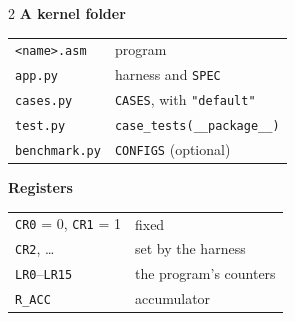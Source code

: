 \documentclass[11pt,a4paper]{article}
\begin{document}
\begin{tcolorbox}[enhanced, colback=white, colframe=muted, boxrule=0.8pt, arc=4pt,
  left=10pt, right=10pt, top=8pt, bottom=10pt]
{\begin{multicols}{2}
\medskip\textbf{\sffamily A kernel folder}\par
\begin{tabular}{@{}ll@{}}
\texttt{<name>.asm} & program \\
\texttt{app.py} & harness and \texttt{SPEC} \\
\texttt{cases.py} & \texttt{CASES}, with \texttt{"default"} \\
\texttt{test.py} & \texttt{case\_tests(\_\_package\_\_)} \\
\texttt{benchmark.py} & \texttt{CONFIGS} (optional) \\
\end{tabular}

\medskip\textbf{\sffamily Registers}\par
\begin{tabular}{@{}ll@{}}
\texttt{CR0} = 0, \texttt{CR1} = 1 & fixed \\
\texttt{CR2}, \ldots & set by the harness \\
\texttt{LR0}--\texttt{LR15} & the program's counters \\
\texttt{R\_ACC} & accumulator \\
\end{tabular}

\end{multicols}
}
\end{tcolorbox}
\end{document}
